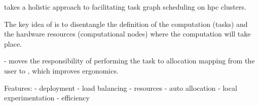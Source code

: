 \hyperqueue{} takes a holistic approach to facilitating task graph scheduling on
\gls{hpc} clusters.



The key idea of \hyperqueue{} is to disentangle the definition of the computation (tasks)
and the hardware resources (computational nodes) where the computation will take place.

- moves the responsibility of performing the task to allocation mapping from the user to
\hyperqueue{},
which improves ergonomics.


Features: - deployment - load balancing - resources - auto allocation - local experimentation -
efficiency

%
%
%
%

